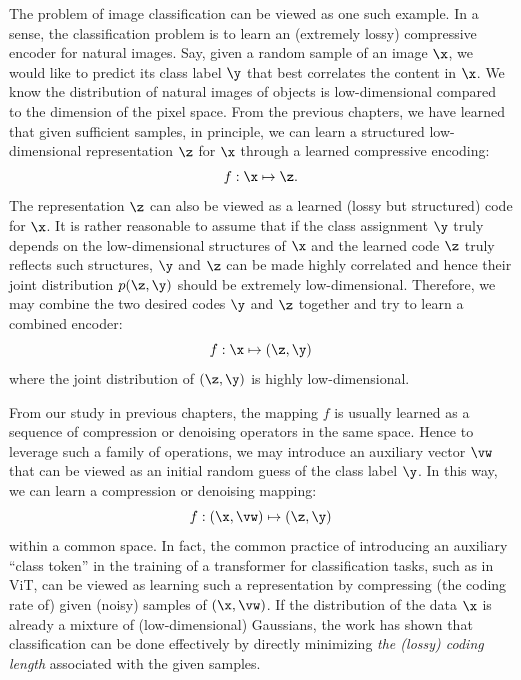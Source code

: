 \documentclass[../../book-main.tex]{subfiles}
\begin{document}
The problem of image classification can be viewed as one such
example. In a sense, the classification problem is to learn an
(extremely lossy) compressive encoder for natural images. Say, given
a random sample of an image $\x$, we would like to predict its class
label $\y$ that best correlates the content in $\x$. We know the
distribution of natural images of objects is low-dimensional compared
to the dimension of the pixel space. From the previous chapters, we
have learned that given sufficient samples, in principle, we can
learn a structured low-dimensional representation $\z$ for $\x$
through a learned compressive encoding:
\begin{equation}
    f: \x \mapsto \z.
\end{equation}
The representation $\z$ can also be viewed as a learned (lossy but
structured) code for $\x$. It is rather reasonable to assume that if
the class assignment $\y$ truly depends on the low-dimensional
structures of $\x$ and the learned code $\z$ truly reflects such
structures, $\y$ and $\z$ can be made highly correlated and hence
their joint distribution $p(\z, \y)$ should be extremely
low-dimensional. Therefore, we may combine the two desired codes $\y$
and $\z$ together and try to learn a combined encoder:
\begin{equation}
    f: \x \mapsto (\z, \y)
\end{equation}
where the joint distribution of $(\z, \y)$ is highly low-dimensional.

From our study in previous chapters, the mapping $f$ is usually
learned as a sequence of compression or denoising operators in the
same space. Hence to leverage such a family of operations, we may
introduce an auxiliary vector $\vw$ that can be viewed as an initial
random guess of the class label $\y$. In this way, we can learn a
compression or denoising mapping:
\begin{equation}\label{eq:classifier-with-class-token}
    f: (\x, \vw) \mapsto (\z, \y)
\end{equation}
within a common space. In fact, the common practice of introducing an
auxiliary ``class token'' in the training of a transformer for
classification tasks, such as in ViT, can be viewed as learning such
a representation by compressing (the coding rate of) given (noisy)
samples of $(\x, \vw)$. If the distribution of the data $\x$ is
already a mixture of (low-dimensional) Gaussians, the work
\cite{wright2008classification} has shown that classification can be
done effectively by directly minimizing {\em the (lossy) coding
length} associated with the given samples.
\end{document}
